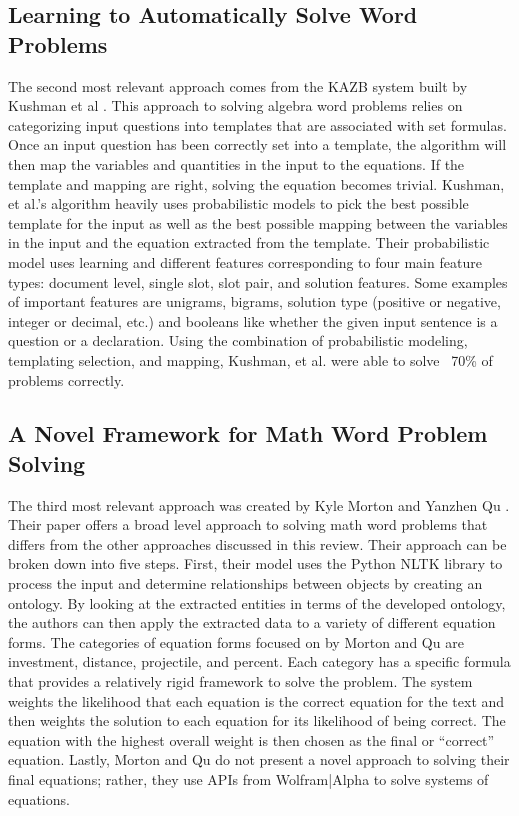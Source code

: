\documentclass[11pt]{article}
\begin{document}
\subsection{Learning to Automatically Solve Word Problems}
The second most relevant approach comes from the KAZB system built by Kushman et al . This approach to solving algebra word problems relies on categorizing input questions into templates that are associated with set formulas. Once an input question has been correctly set into a template, the algorithm will then map the variables and quantities in the input to the equations. If the template and mapping are right, solving the equation becomes trivial. Kushman, et al.’s algorithm heavily uses probabilistic models to pick the best possible template for the input as well as the best possible mapping between the variables in the input and the equation extracted from the template. Their probabilistic model uses learning and different features corresponding to four main feature types: document level, single slot, slot pair, and solution features. Some examples of important features are unigrams, bigrams, solution type (positive or negative, integer or decimal, etc.) and booleans like whether the given input sentence is a question or a declaration. Using the combination of probabilistic modeling, templating selection, and mapping, Kushman, et al. were able to solve ~70\% of problems correctly.

\subsection{A Novel Framework for Math Word Problem Solving}
The third most relevant approach was created by Kyle Morton and Yanzhen Qu . Their paper offers a broad level approach to solving math word problems that differs from the other approaches discussed in this review. Their approach can be broken down into five steps. First, their model uses the Python NLTK library to process the input and determine relationships between objects by creating an ontology. By looking at the extracted entities in terms of the developed ontology, the authors can then apply the extracted data to a variety of different equation forms. The categories of equation forms focused on by Morton and Qu are investment, distance, projectile, and percent. Each category has a specific formula that provides a relatively rigid framework to solve the problem. The system weights the likelihood that each equation is the correct equation for the text and then weights the solution to each equation for its likelihood of being correct. The equation with the highest overall weight is then chosen as the final or ``correct'' equation. Lastly, Morton and Qu do not present a novel approach to solving their final equations; rather, they use APIs from Wolfram|Alpha to solve systems of equations.
\end{document}
